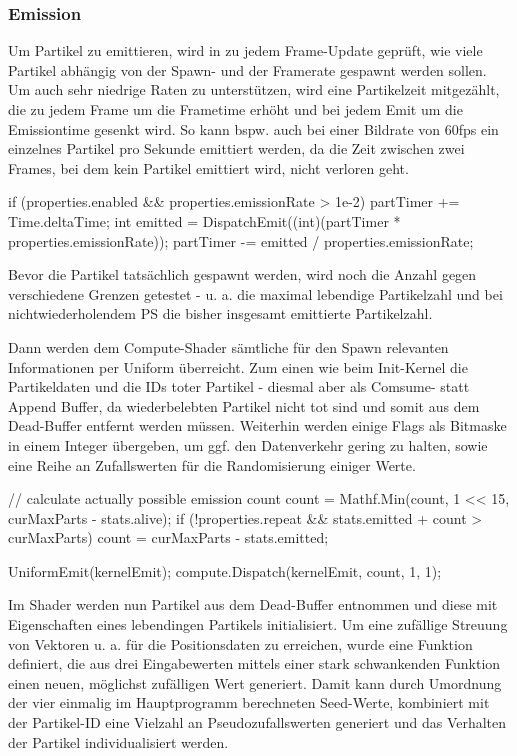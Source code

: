 \subsubsection{Emission}

Um Partikel zu emittieren, wird in zu jedem Frame-Update geprüft, wie viele Partikel abhängig von der Spawn- und der Framerate gespawnt werden sollen. Um auch sehr niedrige Raten zu unterstützen, wird eine Partikelzeit mitgezählt, die zu jedem Frame um die Frametime erhöht und bei jedem Emit um die Emissiontime gesenkt wird. So kann bspw. auch bei einer Bildrate von 60fps ein einzelnes Partikel pro Sekunde emittiert werden, da die Zeit zwischen zwei Frames, bei dem kein Partikel emittiert wird, nicht verloren geht.

\begin{csh}[caption=Controller Emission]
if (properties.enabled && properties.emissionRate > 1e-2)
{
    partTimer += Time.deltaTime;
    int emitted = DispatchEmit((int)(partTimer * properties.emissionRate));
    partTimer -= emitted / properties.emissionRate;
}
\end{csh}

Bevor die Partikel tatsächlich gespawnt werden, wird noch die Anzahl gegen verschiedene Grenzen getestet - u. a. die maximal lebendige Partikelzahl und bei nichtwiederholendem PS die bisher insgesamt emittierte Partikelzahl.

Dann werden dem Compute-Shader sämtliche für den Spawn relevanten Informationen per Uniform überreicht. Zum einen wie beim Init-Kernel die Partikeldaten und die IDs toter Partikel - diesmal aber als Comsume- statt Append Buffer, da wiederbelebten Partikel nicht tot sind und somit aus dem Dead-Buffer entfernt werden müssen. Weiterhin werden einige Flags als Bitmaske in einem Integer übergeben, um ggf. den Datenverkehr gering zu halten, sowie eine Reihe an Zufallswerten für die Randomisierung einiger Werte.

\begin{csh}[caption=Controller Emission Dispatch]
// calculate actually possible emission count
count = Mathf.Min(count, 1 << 15, curMaxParts - stats.alive);
if (!properties.repeat && stats.emitted + count > curMaxParts)
    count = curMaxParts - stats.emitted;

UniformEmit(kernelEmit);
compute.Dispatch(kernelEmit, count, 1, 1);
\end{csh}

Im Shader werden nun Partikel aus dem Dead-Buffer entnommen und diese mit Eigenschaften eines lebendingen Partikels initialisiert. Um eine zufällige Streuung von Vektoren u. a. für die Positionsdaten zu erreichen, wurde eine Funktion definiert, die aus drei Eingabewerten mittels einer stark schwankenden Funktion einen neuen, möglichst zufälligen Wert generiert. Damit kann durch Umordnung der vier einmalig im Hauptprogramm berechneten Seed-Werte, kombiniert mit der Partikel-ID eine Vielzahl an Pseudozufallswerten generiert und das Verhalten der Partikel individualisiert werden.

